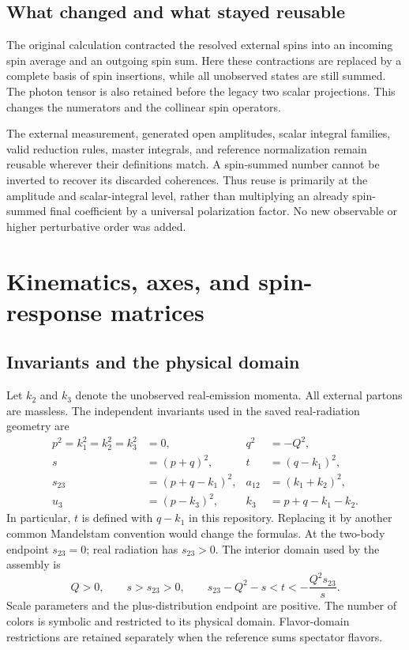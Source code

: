 \documentclass[11pt,a4paper]{article}
\begin{document}
\subsection{What changed and what stayed reusable}
The original calculation contracted the resolved external spins into an incoming spin average and an outgoing spin sum. Here these contractions are replaced by a complete basis of spin insertions, while all unobserved states are still summed. The photon tensor is also retained before the legacy two scalar projections. This changes the numerators and the collinear spin operators.

The external measurement, generated open amplitudes, scalar integral families, valid reduction rules, master integrals, and reference normalization remain reusable wherever their definitions match. A spin-summed number cannot be inverted to recover its discarded coherences. Thus reuse is primarily at the amplitude and scalar-integral level, rather than multiplying an already spin-summed final coefficient by a universal polarization factor. No new observable or higher perturbative order was added.

\section{Kinematics, axes, and spin-response matrices}
\subsection{Invariants and the physical domain}
Let $k_2$ and $k_3$ denote the unobserved real-emission momenta. All external partons are massless. The independent invariants used in the saved real-radiation geometry are
\begin{align}
 p^2=k_1^2=k_2^2=k_3^2&=0, &q^2&=-Q^2,\\
 s&=(p+q)^2, &t&=(q-k_1)^2,\\
 s_{23}&=(p+q-k_1)^2, &a_{12}&=(k_1+k_2)^2,\\
 u_3&=(p-k_3)^2, &k_3&=p+q-k_1-k_2.
\end{align}
In particular, $t$ is defined with $q-k_1$ in this repository. Replacing it by another common Mandelstam convention would change the formulas. At the two-body endpoint $s_{23}=0$; real radiation has $s_{23}>0$. The interior domain used by the assembly is
\begin{equation}
 Q>0,\qquad s>s_{23}>0,\qquad
 s_{23}-Q^2-s<t<-\frac{Q^2s_{23}}{s}.
\end{equation}
Scale parameters and the plus-distribution endpoint are positive. The number of colors is symbolic and restricted to its physical domain. Flavor-domain restrictions are retained separately when the reference sums spectator flavors.
\end{document}
